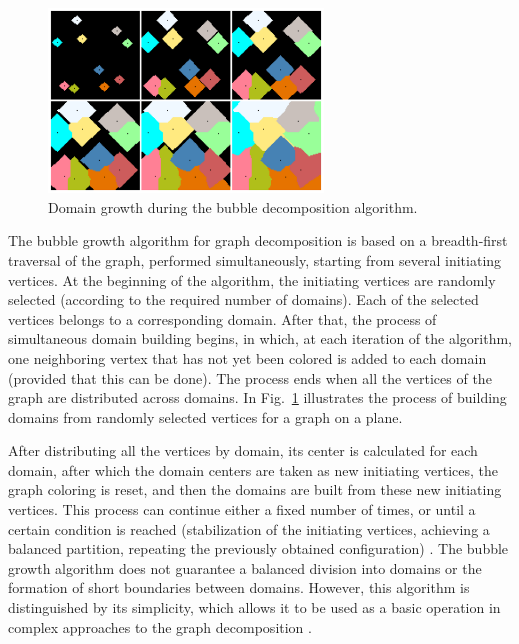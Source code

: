 \documentclass[
11pt,%
tightenlines,%
twoside,%
onecolumn,%
nofloats,%
nobibnotes,%
nofootinbib,%
superscriptaddress,%
noshowpacs,%
centertags]%
{revtex4}
\begin{document}
\begin{figure}[h]
\setcaptionmargin{5mm}
\onelinecaptionstrue  %
\includegraphics[width=0.65\textwidth]{pics/incr.pdf}
\caption{Domain growth during the bubble decomposition algorithm.}\label{fig:incr}
\end{figure}

The bubble growth algorithm for graph decomposition \cite{17Fan} is based on a breadth-first traversal of the graph, performed simultaneously, starting from several initiating vertices.
At the beginning of the algorithm, the initiating vertices are randomly selected (according to the required number of domains).
Each of the selected vertices belongs to a corresponding domain.
After that, the process of simultaneous domain building begins, in which, at each iteration of the algorithm, one neighboring vertex that has not yet been colored is added to each domain (provided that this can be done).
The process ends when all the vertices of the graph are distributed across domains.
In Fig.~\ref{fig:incr} illustrates the process of building domains from randomly selected vertices for a graph on a plane.

After distributing all the vertices by domain, its center is calculated for each domain, after which the domain centers are taken as new initiating vertices, the graph coloring is reset, and then the domains are built from these new initiating vertices.
This process can continue either a fixed number of times, or until a certain condition is reached (stabilization of the initiating vertices, achieving a balanced partition, repeating the previously obtained configuration) \cite{18Golovchenko}.
The bubble growth algorithm does not guarantee a balanced division into domains or the formation of short boundaries between domains.
However, this algorithm is distinguished by its simplicity, which allows it to be used as a basic operation in complex approaches to the graph decomposition \cite{19Wu}.
\end{document}

